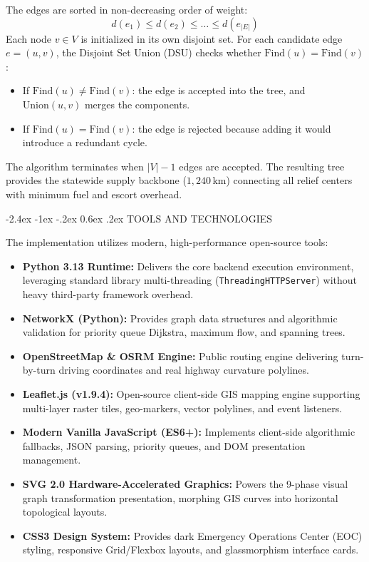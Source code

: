 \documentclass[12pt,oneside]{report}
\makeatletter
\renewcommand{\section}{\@startsection{section}{1}{\z@}%
  {-2.4ex \@plus -1ex \@minus -.2ex}%
  {0.6ex \@plus .2ex}%
  {\normalfont\large\bfseries}}
\makeatother
\begin{document}
The edges are sorted in non-decreasing order of weight:
\begin{equation}
    d(e_1) \le d(e_2) \le \dots \le d(e_{|E|})
\end{equation}
Each node $v \in V$ is initialized in its own disjoint set. For each candidate edge $e = (u, v)$, the Disjoint Set Union (DSU) checks whether $\text{Find}(u) = \text{Find}(v)$:
\begin{itemize}
    \item If $\text{Find}(u) \ne \text{Find}(v)$: the edge is accepted into the tree, and $\text{Union}(u, v)$ merges the components.
    \item If $\text{Find}(u) = \text{Find}(v)$: the edge is rejected because adding it would introduce a redundant cycle.
\end{itemize}
The algorithm terminates when $|V| - 1$ edges are accepted. The resulting tree provides the statewide supply backbone ($1,240$\,km) connecting all relief centers with minimum fuel and escort overhead.

\section{TOOLS AND TECHNOLOGIES}

The implementation utilizes modern, high-performance open-source tools:

\begin{itemize}
    \item \textbf{Python 3.13 Runtime:} Delivers the core backend execution environment, leveraging standard library multi-threading (\texttt{ThreadingHTTPServer}) without heavy third-party framework overhead.
    \item \textbf{NetworkX (Python):} Provides graph data structures and algorithmic validation for priority queue Dijkstra, maximum flow, and spanning trees.
    \item \textbf{OpenStreetMap \& OSRM Engine:} Public routing engine delivering turn-by-turn driving coordinates and real highway curvature polylines.
    \item \textbf{Leaflet.js (v1.9.4):} Open-source client-side GIS mapping engine supporting multi-layer raster tiles, geo-markers, vector polylines, and event listeners.
    \item \textbf{Modern Vanilla JavaScript (ES6+):} Implements client-side algorithmic fallbacks, JSON parsing, priority queues, and DOM presentation management.
    \item \textbf{SVG 2.0 Hardware-Accelerated Graphics:} Powers the 9-phase visual graph transformation presentation, morphing GIS curves into horizontal topological layouts.
    \item \textbf{CSS3 Design System:} Provides dark Emergency Operations Center (EOC) styling, responsive Grid/Flexbox layouts, and glassmorphism interface cards.
\end{itemize}
\end{document}
